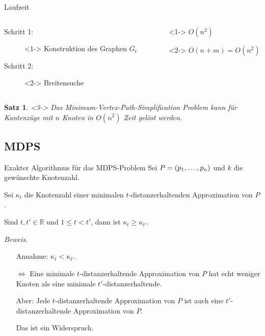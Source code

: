 \documentclass{beamer}
\newtheorem{thm}{Satz}
\begin{document}
	\begin{frame}{Laufzeit}
		\begin{columns}
			\begin{column}{0.6\linewidth}
				\begin{description}
					\item[Schritt 1:]<1-> Konstruktion des Graphen $G_t$
					\item[Schritt 2:]<2-> Breitensuche
				\end{description}
			\end{column}
			\begin{column}{0.5\linewidth}
				\begin{description}
					\item[]<1-> $O(n^2)$
					\item[]<2-> $O(n + m) = O(n^2)$
				\end{description}
			\end{column}
		\end{columns}
		\begin{thm}<3->
			Das Minimum-Vertex-Path-Simplification Problem kann für Kantenzüge mit $n$ Knoten in $O(n^2)$ Zeit gelöst werden.
		\end{thm}
	\end{frame}
	
	\subsection{MDPS}
	\begin{frame}{Exakter Algorithmus für das MDPS-Problem}
		Sei $P = (p_1, \mathellipsis, p_n)$ und $k$ die gewünschte Knotenzahl.
		
		Sei $\kappa_t$ die Knotenzahl einer minimalen $t$-distanzerhaltenden Approximation von $P$.
		
		\begin{lemma}
			Sind $t, t' \in \mathbb{R}$ und $1 \leq t < t'$, dann ist $\kappa_t \geq \kappa_{t'}$.
		\end{lemma}
		\textit{Beweis.}
			\begin{itemize}
				\item[] Annahme: $\kappa_{t} < \kappa_{t'}$.
				
				\item[$\Leftrightarrow$]Eine minimale $t$-distanzerhaltende Approximation von $P$ hat echt weniger Knoten als eine minimale $t'$-distanzerhaltende. 
				
				\item[] Aber: Jede $t$-distanzerhaltende Approximation von $P$ ist auch eine $t'$-distanzerhaltende Approximation von $P$.
				
				Das ist ein Widerspruch.
			\end{itemize}
			
	\end{frame}
	
\end{document}
